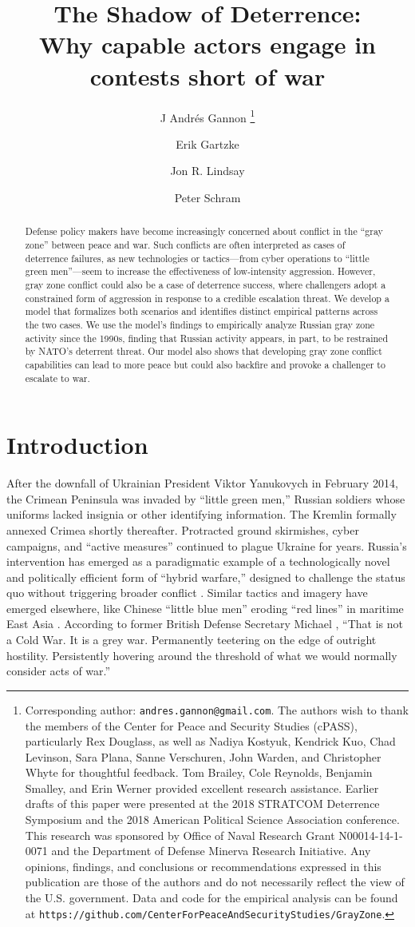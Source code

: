 \documentclass[11pt,letterpaper,pdftex,dvipsnames,table]{article}
\title{The Shadow of Deterrence: \\ Why capable actors engage in contests short of war}
\author{J Andr\'{e}s Gannon%
	\thanks{Corresponding author: \texttt{andres.gannon@gmail.com}. The authors wish to thank the members of the Center for Peace and Security Studies (cPASS), particularly Rex Douglass, as well as Nadiya Kostyuk, Kendrick Kuo, Chad Levinson, Sara Plana, Sanne Verschuren, John Warden, and Christopher Whyte for thoughtful feedback. Tom Brailey, Cole Reynolds, Benjamin Smalley, and Erin Werner provided excellent research assistance. Earlier drafts of this paper were presented at the 2018 STRATCOM Deterrence Symposium and the 2018 American Political Science Association conference. This research was sponsored by Office of Naval Research Grant N00014-14-1-0071 and the Department of Defense Minerva Research Initiative. Any opinions, findings, and conclusions or recommendations expressed in this publication are those of the authors and do not necessarily reflect the view of the U.S. government. Data and code for the empirical analysis can be found at \texttt{https://github.com/CenterForPeaceAndSecurityStudies/GrayZone}.}}
\affil{Stanton Nuclear Security Fellow\\ Council on Foreign Relations}
\author{Erik Gartzke%
}
\affil{Department of Political Science\\ University of California, San Diego}
\author{Jon R. Lindsay%
}
\affil{School of Cybersecurity and Privacy \\ Georgia Institute of Technology}
\author{Peter Schram%
}
\affil{Department of Political Science\\ Vanderbilt University}
\begin{document}
\maketitle


\begin{abstract}
\begin{singlespace}
\noindent Defense policy makers have become increasingly concerned about conflict in the ``gray zone'' between peace and war. Such conflicts are often interpreted as cases of deterrence failures, as new technologies or tactics---from cyber operations to ``little green men''---seem to increase the effectiveness of low-intensity aggression. However, gray zone conflict could also be a case of deterrence success, where challengers adopt a constrained form of aggression in response to a credible escalation threat. We develop a model that formalizes both scenarios and identifies distinct empirical patterns across the two cases. We use the model’s findings to empirically analyze Russian gray zone activity since the 1990s, finding that Russian activity appears, in part, to be restrained by NATO’s deterrent threat. Our model also shows that developing gray zone conflict capabilities can lead to more peace but could also backfire and provoke a challenger to escalate to war.

\end{singlespace}
\end{abstract}

\setcounter{page}{0}
\thispagestyle{empty}

\newpage

\section{Introduction}
After the downfall of Ukrainian President Viktor Yanukovych in February 2014, the Crimean Peninsula was invaded by “little green men,” Russian soldiers whose uniforms lacked insignia or other identifying information. The Kremlin formally annexed Crimea shortly thereafter. Protracted ground skirmishes, cyber campaigns, and ``active measures'' continued to plague Ukraine for years. Russia's intervention has emerged as a paradigmatic example of a technologically novel and politically efficient form of ``hybrid warfare,'' designed to challenge the status quo without triggering broader conflict \citep{marten_putinchoicesexplaining_2015, lanoszka_russianhybridwarfare_2016}. Similar tactics and imagery have emerged elsewhere, like Chinese ``little blue men'' eroding ``red lines'' in maritime East Asia \citep{green_counteringcoercionmaritime_2017}. According to former British Defense Secretary Michael \citet{fallon_speechdeliveredsecretary_2017}, ``That is not a Cold War. It is a grey war. Permanently teetering on the edge of outright hostility. Persistently hovering around the threshold of what we would normally consider acts of war.''
\end{document}
